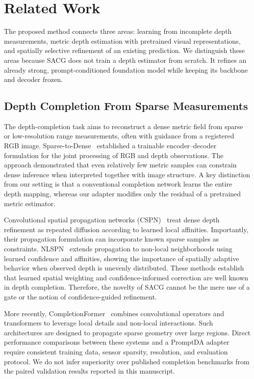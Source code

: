\section{Related Work}
\label{sec:related}
The proposed method connects three areas: learning from incomplete depth measurements, metric depth estimation with pretrained visual representations, and spatially selective refinement of an existing prediction. We distinguish these areas because SACG does not train a depth estimator from scratch. It refines an already strong, prompt-conditioned foundation model while keeping its backbone and decoder frozen.

\subsection{Depth Completion From Sparse Measurements}
The depth-completion task aims to reconstruct a dense metric field from sparse or low-resolution range measurements, often with guidance from a registered RGB image. Sparse-to-Dense~\cite{ma2018sparse} established a trainable encoder--decoder formulation for the joint processing of RGB and depth observations. The approach demonstrated that even relatively few metric samples can constrain dense inference when interpreted together with image structure. A key distinction from our setting is that a conventional completion network learns the entire depth mapping, whereas our adapter modifies only the residual of a pretrained metric estimator.

Convolutional spatial propagation networks (CSPN)~\cite{cheng2018cspn} treat dense depth refinement as repeated diffusion according to learned local affinities. Importantly, their propagation formulation can incorporate known sparse samples as constraints. NLSPN~\cite{park2020nlspn} extends propagation to non-local neighborhoods using learned confidence and affinities, showing the importance of spatially adaptive behavior when observed depth is unevenly distributed. These methods establish that learned spatial weighting and confidence-informed correction are well known in depth completion. Therefore, the novelty of SACG cannot be the mere use of a gate or the notion of confidence-guided refinement.

More recently, CompletionFormer~\cite{zhang2023completionformer} combines convolutional operators and transformers to leverage local details and non-local interactions. Such architectures are designed to propagate sparse geometry over large regions. Direct performance comparisons between these systems and a PromptDA adapter require consistent training data, sensor sparsity, resolution, and evaluation protocol. We do not infer superiority over published completion benchmarks from the paired validation results reported in this manuscript.


